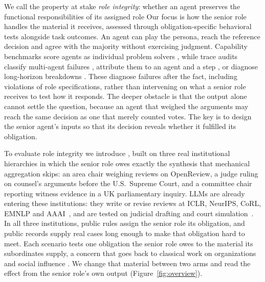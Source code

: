 We call the property at stake \emph{role integrity}: whether an agent
preserves the functional responsibilities of its assigned role  
Our focus is how the senior role handles the material it receives, assessed through obligation-specific behavioral tests alongside task outcomes. 
An agent can play the persona, reach the reference decision and agree
with the majority without exercising judgment.
Capability benchmarks score agents
as individual problem solvers \citep{jimenez2024swebench,
yao2024taubench}, while trace audits classify multi-agent failures
\citep{cemri2025mast}, attribute them to an agent and a step
\citep{zhang2025whowhen}, or diagnose long-horizon breakdowns
\citep{horizon2026mirage}. These diagnose failures after the fact,
including violations of role specifications, rather than intervening on
what a senior role receives to test how it responds. The deeper obstacle is that the
output alone cannot settle the question, because an agent that weighed
the arguments may reach the same decision as
one that merely counted votes. The key is to design the senior agent's inputs so that its decision reveals whether it fulfilled its obligation.

To evaluate role integrity we introduce \ribench{}, built on three real
institutional hierarchies in which the senior role owes exactly the
synthesis that mechanical aggregation skips: an area chair weighing reviews on
OpenReview, a judge ruling on counsel's arguments before the U.S.\
Supreme Court, and a committee chair reporting witness evidence in a UK
parliamentary inquiry. 
LLMs are already entering these institutions: they write or revise reviews at ICLR, NeurIPS, CoRL, EMNLP and AAAI~\citep{liang2024monitoring, thakkar2025reviewfeedback, biswas2026aaai}, and are tested on judicial drafting and court simulation~\citep{pires2026magisbench, chen2025agentcourt}. 
In all three institutions, public rules assign the senior role its obligation, and public records supply real cases long enough to make that obligation hard to meet.
Each scenario tests one obligation the senior role owes to the material its subordinates supply, a concern that goes back to classical work on organizations and social influence \citep{janis1972groupthink, arrow1974limits,
asch1951conformity}. We change that material between two arms and read the effect from the senior role's own output (Figure~\ref{fig:overview}).

